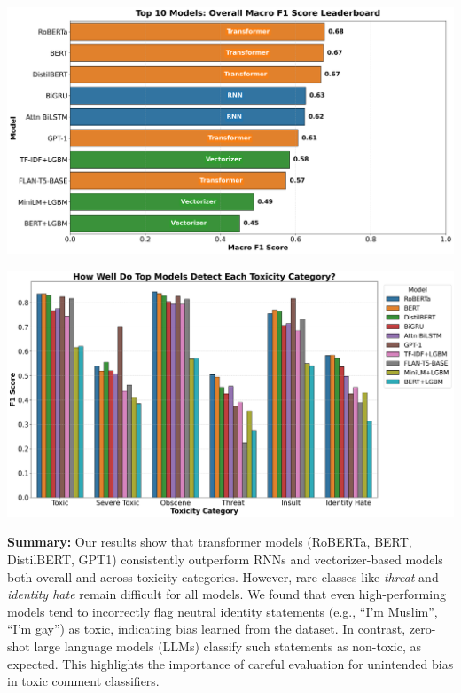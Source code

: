 
{
    \begin{center}
        \begin{minipage}{0.48\linewidth}
            \includegraphics[width=\linewidth]{figures/macro_f1_comparison_1.png}
        \end{minipage}
        \hfill
        \begin{minipage}{0.48\linewidth}
            \includegraphics[width=\linewidth]{figures/per_class_f1_comparison.png}
        \end{minipage}
        \vspace{0.01em}
        \normalsize
        \begin{flushleft}
        \textbf{Summary:} Our results show that transformer models (RoBERTa, BERT, DistilBERT, GPT1) consistently outperform RNNs and vectorizer-based models both overall and across toxicity categories. However, rare classes like \textit{threat} and \textit{identity hate} remain difficult for all models. We found that even high-performing models tend to incorrectly flag neutral identity statements (e.g., ``I'm Muslim'', ``I'm gay'') as toxic, indicating bias learned from the dataset. In contrast, zero-shot large language models (LLMs) classify such statements as non-toxic, as expected. This highlights the importance of careful evaluation for unintended bias in toxic comment classifiers.
        \end{flushleft}
    \end{center}
}

